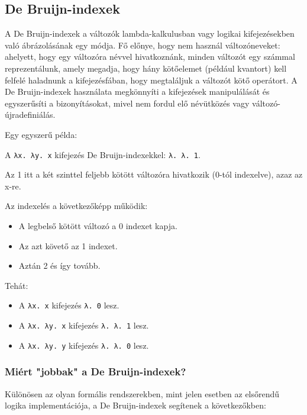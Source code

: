 \subsection{De Bruijn-indexek}

A De Bruijn-indexek a változók lambda-kalkulusban vagy logikai kifejezésekben való ábrázolásának egy módja. Fő előnye, hogy nem használ változóneveket: ahelyett, hogy egy változóra névvel hivatkoznánk, minden változót egy számmal reprezentálunk, amely megadja, hogy hány kötőelemet (például kvantort) kell felfelé haladnunk a kifejezésfában, hogy megtaláljuk a változót kötő operátort. A De Bruijn-indexek használata megkönnyíti a kifejezések manipulálását és egyszerűsíti a bizonyításokat, mivel nem fordul elő névütközés vagy változó-újradefiniálás.

Egy egyszerű példa:

A \texttt{λx. λy. x} kifejezés De Bruijn-indexekkel: \texttt{λ. λ. 1}.

Az 1 itt a két szinttel feljebb kötött változóra hivatkozik (0-tól indexelve), azaz az x-re.

Az indexelés a következőképp működik:

\begin{itemize}
\item A legbelső kötött változó a 0 indexet kapja.
\item Az azt követő az 1 indexet.
\item Aztán 2 és így tovább.
\end{itemize}

Tehát:

\begin{itemize}
\item A \texttt{λx. x} kifejezés \texttt{λ. 0} lesz.
\item A \texttt{λx. λy. x} kifejezés \texttt{λ. λ. 1} lesz.
\item A \texttt{λx. λy. y} kifejezés \texttt{λ. λ. 0} lesz.
\end{itemize}

\subsubsection{Miért "jobbak" a De Bruijn-indexek?}
Különösen az olyan formális rendszerekben, mint jelen esetben az elsőrendű logika implementációja, a De Bruijn-indexek segítenek a következőkben:

